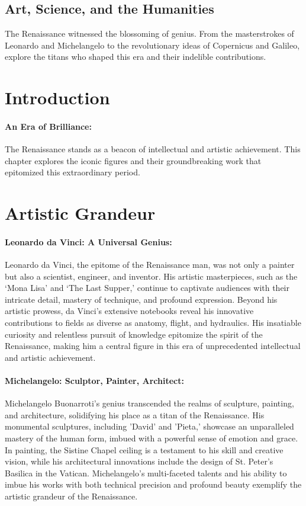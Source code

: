 \documentclass[a4paper,12pt]{book}
\begin{document}
\subsection*{Art, Science, and the Humanities}
The Renaissance witnessed the blossoming of genius. From the masterstrokes of Leonardo and Michelangelo to the revolutionary ideas of Copernicus and Galileo, explore the titans who shaped this era and their indelible contributions.

\section*{Introduction}

\paragraph{An Era of Brilliance:}
The Renaissance stands as a beacon of intellectual and artistic achievement. This chapter explores the iconic figures and their groundbreaking work that epitomized this extraordinary period.

\section*{Artistic Grandeur}

\paragraph{Leonardo da Vinci: A Universal Genius:}
Leonardo da Vinci, the epitome of the Renaissance man, was not only a painter but also a scientist, engineer, and inventor. His artistic masterpieces, such as the ‘Mona Lisa’ and ‘The Last Supper,’ continue to captivate audiences with their intricate detail, mastery of technique, and profound expression. Beyond his artistic prowess, da Vinci's extensive notebooks reveal his innovative contributions to fields as diverse as anatomy, flight, and hydraulics. His insatiable curiosity and relentless pursuit of knowledge epitomize the spirit of the Renaissance, making him a central figure in this era of unprecedented intellectual and artistic achievement.

\paragraph{Michelangelo: Sculptor, Painter, Architect:}
Michelangelo Buonarroti’s genius transcended the realms of sculpture, painting, and architecture, solidifying his place as a titan of the Renaissance. His monumental sculptures, including 'David' and 'Pieta,' showcase an unparalleled mastery of the human form, imbued with a powerful sense of emotion and grace. In painting, the Sistine Chapel ceiling is a testament to his skill and creative vision, while his architectural innovations include the design of St. Peter’s Basilica in the Vatican. Michelangelo's multi-faceted talents and his ability to imbue his works with both technical precision and profound beauty exemplify the artistic grandeur of the Renaissance.
\end{document}
